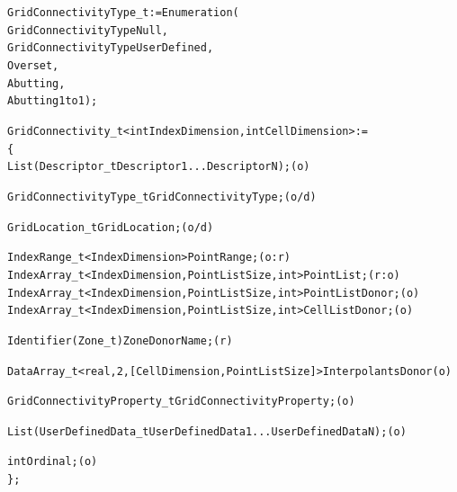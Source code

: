 \begin{alltt}
  GridConnectivityType\_t := Enumeration(
    GridConnectivityTypeNull,
    GridConnectivityTypeUserDefined,
    Overset,
    Abutting,
    Abutting1to1 ) ;

  GridConnectivity\_t< int IndexDimension, int CellDimension > :=
    \{
    List( Descriptor\_t Descriptor1 ... DescriptorN ) ;                      (o)

    GridConnectivityType\_t GridConnectivityType ;                           (o/d)

    GridLocation\_t GridLocation ;                                           (o/d)

    IndexRange\_t<IndexDimension> PointRange ;                               (o:r)
    IndexArray\_t<IndexDimension, PointListSize, int>  PointList ;           (r:o)
    IndexArray\_t<IndexDimension, PointListSize, int>  PointListDonor ;      (o)
    IndexArray\_t<IndexDimension, PointListSize, int>  CellListDonor ;       (o)

    Identifier(Zone\_t) ZoneDonorName ;                                      (r)

    DataArray\_t <real, 2, [CellDimension, PointListSize]> InterpolantsDonor (o)

    GridConnectivityProperty\_t GridConnectivityProperty ;                   (o)

    List( UserDefinedData\_t UserDefinedData1 ... UserDefinedDataN ) ;       (o)

    int Ordinal ;                                                           (o)
    \} ;
\end{alltt}


